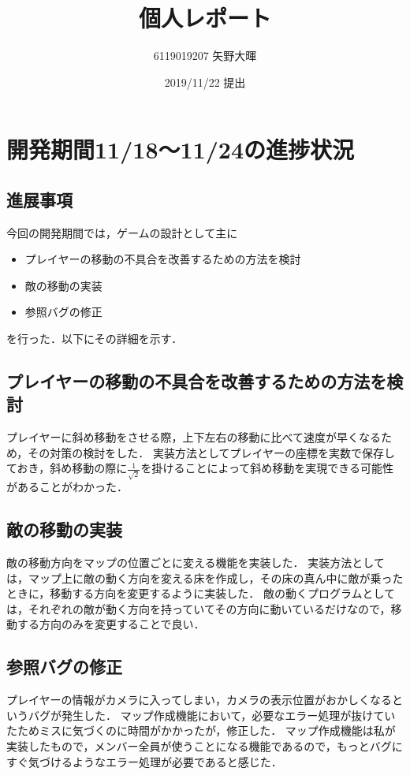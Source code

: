 \documentclass{jarticle}
\title{個人レポート}
\author{6119019207 矢野大暉}
\date{2019/11/22 提出}
\begin{document}
\maketitle

\section{開発期間11/18～11/24の進捗状況} 
\subsection{進展事項}
今回の開発期間では，ゲームの設計として主に
\begin{itemize}
\item プレイヤーの移動の不具合を改善するための方法を検討
\item 敵の移動の実装
\item 参照バグの修正
\end{itemize}
を行った．以下にその詳細を示す．


\subsection{プレイヤーの移動の不具合を改善するための方法を検討}
プレイヤーに斜め移動をさせる際，上下左右の移動に比べて速度が早くなるため，その対策の検討をした．
実装方法としてプレイヤーの座標を実数で保存しておき，斜め移動の際に$\frac{1}{\sqrt2}$を掛けることによって斜め移動を実現できる可能性があることがわかった．

\subsection{敵の移動の実装}
敵の移動方向をマップの位置ごとに変える機能を実装した．
実装方法としては，マップ上に敵の動く方向を変える床を作成し，その床の真ん中に敵が乗ったときに，移動する方向を変更するように実装した．
敵の動くプログラムとしては，それぞれの敵が動く方向を持っていてその方向に動いているだけなので，移動する方向のみを変更することで良い．

\subsection{参照バグの修正}
プレイヤーの情報がカメラに入ってしまい，カメラの表示位置がおかしくなるというバグが発生した．
マップ作成機能において，必要なエラー処理が抜けていたためミスに気づくのに時間がかかったが，修正した．
マップ作成機能は私が実装したもので，メンバー全員が使うことになる機能であるので，もっとバグにすぐ気づけるようなエラー処理が必要であると感じた．
\end{document}
